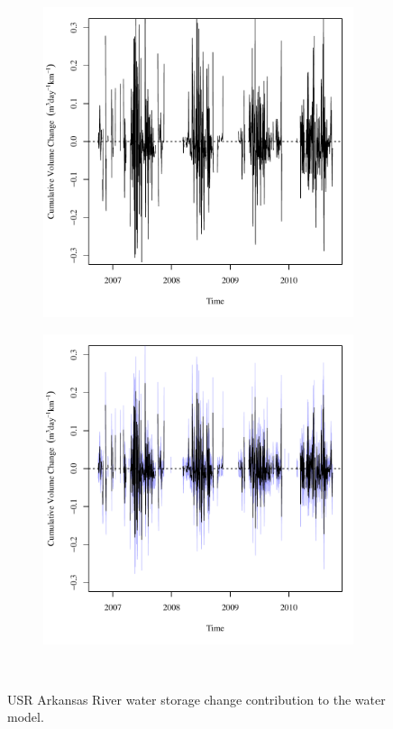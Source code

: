 \begin{linenumbers}
\begin{figure}[htbp]
\centering
	\begin{subfigure}{0.5\textwidth}
		\centering
		\includegraphics[width=0.9\linewidth]{"Figures/Results_USR/Deterministic/Balance Water - storage"}
		\label{sub:USRWaterStoreD}
	\end{subfigure}%
	\begin{subfigure}{0.5\textwidth}
		\centering
		\includegraphics[width=0.9\linewidth]{"Figures/Results_USR/Stochastic/Balance Water - storage"}
		\label{sub:USRWaterStoreS}
	\end{subfigure}\\
	\caption[USR Arkansas River water storage change contribution to the water model.]{USR Arkansas River water storage change contribution to the water model.}
	\label{fig:USRWaterStore}
\end{figure}


\end{linenumbers}
